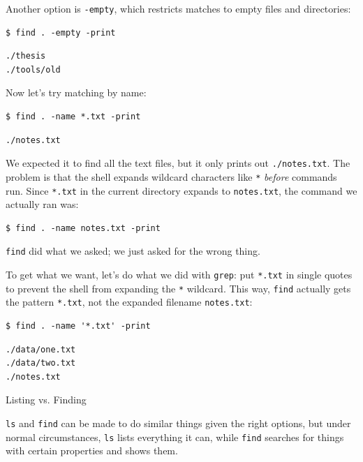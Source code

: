 \documentclass{book}
\begin{document}
Another option is \texttt{-empty}, which restricts matches to empty
files and directories:

\begin{verbatim}
$ find . -empty -print
\end{verbatim}

\begin{verbatim}
./thesis
./tools/old
\end{verbatim}

Now let's try matching by name:

\begin{verbatim}
$ find . -name *.txt -print
\end{verbatim}

\begin{verbatim}
./notes.txt
\end{verbatim}

We expected it to find all the text files, but it only prints out
\texttt{./notes.txt}. The problem is that the shell expands wildcard
characters like \texttt{*} \emph{before} commands run. Since
\texttt{*.txt} in the current directory expands to \texttt{notes.txt},
the command we actually ran was:

\begin{verbatim}
$ find . -name notes.txt -print
\end{verbatim}

\texttt{find} did what we asked; we just asked for the wrong thing.

To get what we want, let's do what we did with \texttt{grep}: put
\texttt{*.txt} in single quotes to prevent the shell from expanding the
\texttt{*} wildcard. This way, \texttt{find} actually gets the pattern
\texttt{*.txt}, not the expanded filename \texttt{notes.txt}:

\begin{verbatim}
$ find . -name '*.txt' -print
\end{verbatim}

\begin{verbatim}
./data/one.txt
./data/two.txt
./notes.txt
\end{verbatim}

\begin{swcbox}{Listing vs. Finding}

\texttt{ls} and \texttt{find} can be made to do similar things given the
right options, but under normal circumstances, \texttt{ls} lists
everything it can, while \texttt{find} searches for things with certain
properties and shows them.

\end{swcbox}
\end{document}
